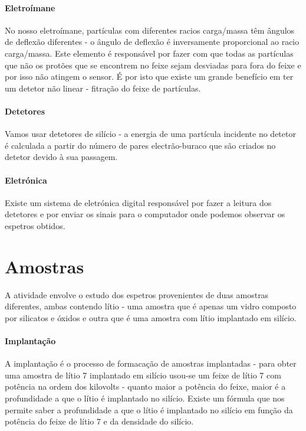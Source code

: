 \documentclass{article}
\begin{document}
\begin{multicols}{2}
\paragraph*{Eletroímane} No nosso eletroímane, partículas com diferentes racios carga/massa têm ângulos de deflexão diferentes - o ângulo de deflexão é inversamente proporcional ao racio carga/massa. Este elemento é responsável por fazer com que todas as partículas que não os protões que se encontrem no feixe sejam desviadas para fora do feixe e por isso não atingem o sensor. É por isto que existe um grande benefício em ter um detetor não linear - fitração do feixe de partículas.

\paragraph*{Detetores} Vamos usar detetores de silício - a energia de uma partícula incidente no detetor é calculada a partir do número de pares electrão-buraco que são criados no detetor devido à sua passagem.

\paragraph*{Eletrónica} Existe um sistema de eletrónica digital responsável por fazer a leitura dos detetores e por enviar os sinais para o computador onde podemos observar os espetros obtidos.

\section{Amostras}

A atividade envolve o estudo dos espetros provenientes de duas amostras diferentes, ambas contendo lítio - uma amostra que é apenas um vidro composto por silicatos e óxidos e outra que é uma amostra com lítio implantado em silício.

\paragraph*{Implantação} A implantação é o processo de formacação de amostras implantadas - para obter uma amostra de lítio 7 implantado em silício usou-se um feixe de lítio 7 com potência na ordem dos kilovolts - quanto maior a potência do feixe, maior é a profundidade a que o lítio é implantado no silício. 
Existe um fórmula que nos permite saber a profundidade a que o lítio é implantado no silício em função da potência do feixe de lítio 7 e da densidade do silício.


\end{multicols}
\end{document}
